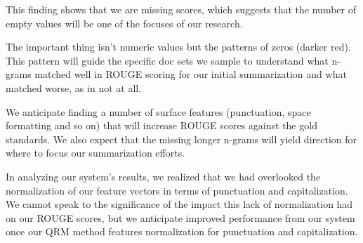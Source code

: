 \documentclass[11pt,a4paper]{article}
\begin{document}
This finding shows that we are missing scores, which suggests that the number of empty values will be one of the focuses of our research.

The important thing isn't numeric values but the patterns of zeros (darker red). This pattern will guide the specific doc sets we sample to understand what n-grams matched well in ROUGE scoring for our initial summarization and what matched worse, as in not at all.

We anticipate finding a number of surface features (punctuation, space formatting and so on) that will increase ROUGE scores against the gold standards. We also expect that the missing longer n-grams will yield direction for where to focus our summarization efforts.

In analyzing our system’s results, we realized that we had overlooked the normalization of our feature vectors in terms of punctuation and capitalization. We cannot speak to the significance of the impact this lack of normalization had on our ROUGE scores, but we anticipate improved performance from our system once  our QRM method features normalization for punctuation and capitalization.






\end{document}

